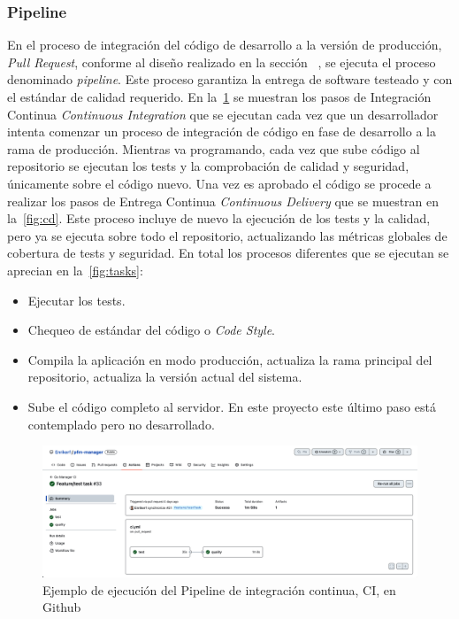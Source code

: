
\subsubsection{Pipeline}

En el proceso de integración del código de desarrollo a la versión de producción, \textit{Pull Request}, conforme al diseño realizado en la sección ~, se ejecuta el proceso denominado \textit{pipeline}.
Este proceso garantiza la entrega de software testeado y con el estándar de calidad requerido.
En la~\cref{fig:ci} se muestran los pasos de Integración Continua \textit{Continuous Integration} que se ejecutan cada vez que un desarrollador intenta comenzar un proceso de integración de código en fase de desarrollo a la rama de producción.
Mientras va programando, cada vez que sube código al repositorio se ejecutan los tests y la comprobación de calidad y seguridad, únicamente sobre el código nuevo.
Una vez es aprobado el código se procede a realizar los pasos de Entrega Continua \textit{Continuous Delivery} que se muestran en la~\cref{fig:cd}.
Este proceso incluye de nuevo la ejecución de los tests y la calidad, pero ya se ejecuta sobre todo el repositorio, actualizando las métricas globales de cobertura de tests y seguridad.
En total los procesos diferentes que se ejecutan se aprecian en la~\cref{fig:tasks}:

\begin{itemize}
    \item Ejecutar los tests.
    \item Chequeo de estándar del código o \textit{Code Style}.
    \item Compila la aplicación en modo producción, actualiza la rama principal del repositorio, actualiza la versión actual del sistema.
    \item Sube el código completo al servidor.
    En este proyecto este último paso está contemplado pero no desarrollado.
\end{itemize}

\begin{figure}[H]
    \centering
    \includegraphics[height=0.23\textheight]{./part/Ejecucion/Seguimiento/PuestaAPunto/img/CI pipeline PR}
    \caption{Ejemplo de ejecución del Pipeline de integración continua, CI, en Github}\label{fig:ci}
\end{figure}

